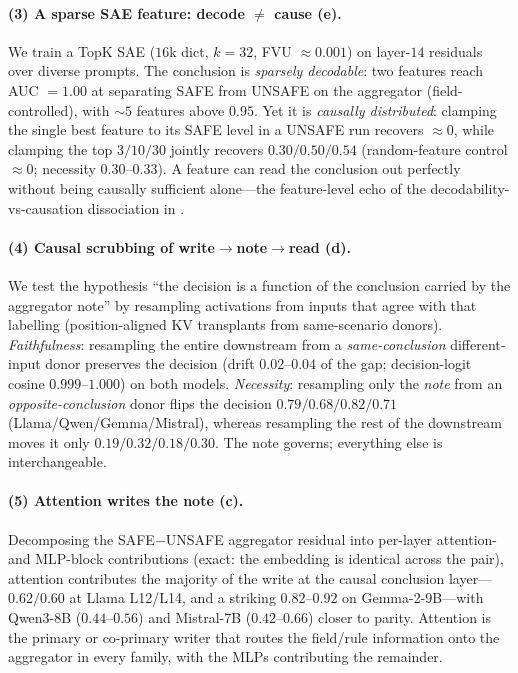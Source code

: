 \paragraph{(3) A sparse SAE feature: decode $\neq$ cause (e).} We train a TopK SAE
($16$k dict, $k{=}32$, FVU ${\approx}0.001$) on layer-$14$ residuals over diverse prompts. The conclusion is
\emph{sparsely decodable}: two features reach AUC $=1.00$ at separating SAFE from UNSAFE on the aggregator
(field-controlled), with ${\sim}5$ features above $0.95$. Yet it is \emph{causally distributed}: clamping the
single best feature to its SAFE level in a UNSAFE run recovers $\approx 0$, while clamping the top
$3/10/30$ jointly recovers $0.30/0.50/0.54$ (random-feature control $\approx 0$; necessity $0.30$--$0.33$).
A feature can read the conclusion out perfectly without being causally sufficient alone---the feature-level
echo of the decodability-vs-causation dissociation in .

\paragraph{(4) Causal scrubbing of write$\to$note$\to$read (d).} We test the hypothesis
``the decision is a function of the conclusion carried by the aggregator note'' by resampling activations
from inputs that agree with that labelling (position-aligned KV transplants from same-scenario donors).
\emph{Faithfulness}: resampling the entire downstream from a \emph{same-conclusion} different-input donor
preserves the decision (drift $0.02$--$0.04$ of the gap; decision-logit cosine $0.999$--$1.000$) on both
models. \emph{Necessity}: resampling only the \emph{note} from an \emph{opposite-conclusion} donor flips the
decision $0.79/0.68/0.82/0.71$ (Llama/Qwen/Gemma/Mistral), whereas resampling the rest of the downstream
moves it only $0.19/0.32/0.18/0.30$. The note governs; everything else is interchangeable.

\paragraph{(5) Attention writes the note (c).} Decomposing the SAFE$-$UNSAFE aggregator
residual into per-layer attention- and MLP-block contributions (exact: the embedding is identical across
the pair), attention contributes the majority of the write at the causal conclusion layer---$0.62/0.60$ at
Llama L12/L14, and a striking $0.82$--$0.92$ on Gemma-2-9B---with Qwen3-8B ($0.44$--$0.56$) and Mistral-7B
($0.42$--$0.66$) closer to parity. Attention is the primary or co-primary writer that routes the field/rule
information onto the aggregator in every family, with the MLPs contributing the remainder.


